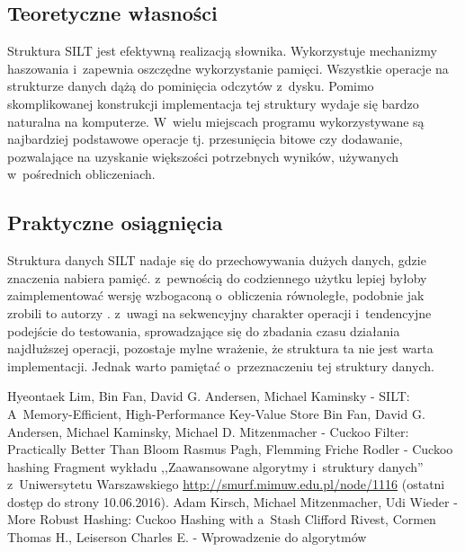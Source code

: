 \documentclass[declaration,shortabstract,masc]{iithesis}
\begin{document}
			\subsection{Teoretyczne własności}
				Struktura SILT jest efektywną realizacją słownika. Wykorzystuje mechanizmy haszowania i~zapewnia oszczędne wykorzystanie pamięci. Wszystkie operacje na strukturze danych dążą do pominięcia odczytów z~dysku. Pomimo skomplikowanej konstrukcji implementacja tej struktury wydaje się bardzo naturalna na komputerze. W~wielu miejscach programu wykorzystywane są najbardziej podstawowe operacje tj. przesunięcia bitowe czy dodawanie, pozwalające na uzyskanie większości potrzebnych wyników, używanych w~pośrednich obliczeniach.
			\subsection{Praktyczne osiągnięcia}
				Struktura danych SILT nadaje się do przechowywania dużych danych, gdzie znaczenia nabiera pamięć. z~pewnością do codziennego użytku lepiej byłoby zaimplementować wersję wzbogaconą o~obliczenia równoległe, podobnie jak zrobili to autorzy \cite{SILT}. z~uwagi na sekwencyjny charakter operacji i~tendencyjne podejście do testowania, sprowadzające się do zbadania czasu działania najdłuższej operacji, pozostaje mylne wrażenie, że struktura ta nie jest warta implementacji. Jednak warto pamiętać o~przeznaczeniu tej struktury danych.
	\begin{thebibliography}{3}
		 Hyeontaek Lim, Bin Fan, David G. Andersen, Michael Kaminsky - SILT: A~Memory-Efficient, High-Performance Key-Value Store
		 Bin Fan, David G. Andersen, Michael Kaminsky, Michael D. Mitzenmacher - Cuckoo Filter: Practically Better Than Bloom
		 Rasmus Pagh, Flemming Friche Rodler - Cuckoo hashing
		 Fragment wykładu ,,Zaawansowane algorytmy i~struktury danych'' z~Uniwersytetu Warszawskiego \url{http://smurf.mimuw.edu.pl/node/1116} (ostatni dostęp do strony 10.06.2016).
		 Adam Kirsch, Michael Mitzenmacher, Udi Wieder - More Robust Hashing: Cuckoo Hashing with a~Stash
		 Clifford Rivest, Cormen Thomas H., Leiserson Charles E. - Wprowadzenie do algorytmów
	\end{thebibliography}
\end{document}
